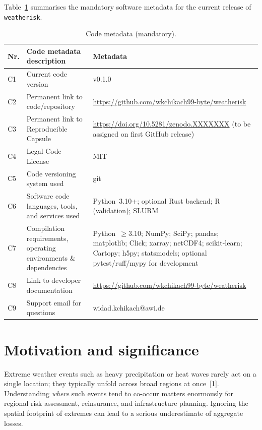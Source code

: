 \documentclass[preprint,12pt,a4paper]{elsarticle}
\begin{document}
Table~\ref{tab:metadata} summarises the mandatory software metadata
for the current release of \texttt{weatherisk}.

\begin{table}[!h]
\small
\begin{tabularx}{\textwidth}{|l|>{\raggedright\arraybackslash}p{4.9cm}|>{\raggedright\arraybackslash}X|}
\hline
\textbf{Nr.} & \textbf{Code metadata description} & \textbf{Metadata} \\
\hline
C1 & Current code version & v0.1.0 \\
\hline
C2 & Permanent link to code/repository &
  \url{https://github.com/wkchikach99-byte/weatherisk} \\
\hline
C3 & Permanent link to Reproducible Capsule &
  \url{https://doi.org/10.5281/zenodo.XXXXXXX} (to be assigned on first GitHub release) \\
\hline
C4 & Legal Code License & MIT \\
\hline
C5 & Code versioning system used & git \\
\hline
C6 & Software code languages, tools, and services used &
  Python~3.10+; optional Rust backend; R (validation); SLURM \\
\hline
C7 & Compilation requirements, operating environments
  \& dependencies &
  Python~$\geq$3.10; NumPy; SciPy; pandas; matplotlib;
  Click; xarray; netCDF4; scikit-learn; Cartopy; h5py;
  statsmodels; optional pytest/ruff/mypy for development \\
\hline
C8 & Link to developer documentation &
  \url{https://github.com/wkchikach99-byte/weatherisk} \\
\hline
C9 & Support email for questions & widad.kchikach@awi.de \\
\hline
\end{tabularx}
\caption{Code metadata (mandatory).}
\label{tab:metadata}
\end{table}


\section{Motivation and significance}
\label{sec:motivation}

Extreme weather events such as heavy precipitation or heat waves
rarely act on a single location; they typically unfold across broad
regions at once~[1]. Understanding \emph{where} such events tend to
co-occur matters enormously for regional risk assessment, reinsurance,
and infrastructure planning. Ignoring the spatial footprint of
extremes can lead to a serious underestimate of aggregate losses.
\end{document}

